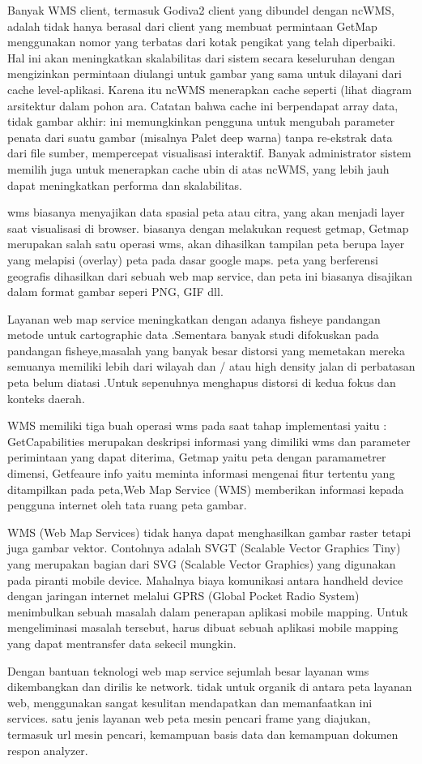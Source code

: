 Banyak WMS client, termasuk Godiva2 client yang dibundel dengan ncWMS, adalah tidak hanya berasal dari client yang membuat permintaan GetMap menggunakan nomor yang terbatas dari kotak pengikat yang telah diperbaiki. Hal ini akan meningkatkan skalabilitas dari sistem secara keseluruhan dengan mengizinkan permintaan diulangi untuk gambar yang sama untuk dilayani dari cache level-aplikasi. Karena itu ncWMS menerapkan cache seperti (lihat diagram arsitektur dalam pohon ara.  Catatan bahwa cache ini berpendapat array data, tidak gambar akhir: ini memungkinkan pengguna untuk mengubah parameter penata dari suatu gambar (misalnya Palet deep warna) tanpa re-ekstrak data dari file sumber, mempercepat visualisasi interaktif. Banyak administrator sistem memilih juga untuk menerapkan cache ubin di atas ncWMS, yang lebih jauh dapat meningkatkan performa dan skalabilitas.

wms biasanya menyajikan data spasial peta atau citra, yang akan menjadi layer saat visualisasi di browser. 
biasanya dengan melakukan request getmap, Getmap merupakan salah satu operasi wms, akan dihasilkan tampilan peta berupa layer yang melapisi (overlay) peta pada dasar google maps. peta yang berferensi geografis dihasilkan dari sebuah web map service, dan peta ini biasanya disajikan dalam format gambar seperi PNG, GIF dll.

Layanan web map service  meningkatkan dengan  adanya fisheye pandangan metode untuk cartographic data .Sementara banyak studi difokuskan pada pandangan fisheye,masalah yang banyak besar distorsi yang memetakan mereka semuanya memiliki lebih dari wilayah dan / atau high density jalan di perbatasan peta belum diatasi .Untuk sepenuhnya menghapus distorsi di kedua fokus dan konteks daerah.

WMS memiliki tiga buah operasi wms pada saat tahap implementasi yaitu : GetCapabilities merupakan deskripsi informasi yang dimiliki wms
dan parameter perimintaan yang dapat diterima, Getmap yaitu peta dengan paramametrer dimensi, Getfeaure info yaitu meminta informasi 
mengenai fitur tertentu yang ditampilkan pada peta,Web Map Service (WMS) memberikan informasi kepada pengguna internet oleh tata ruang peta gambar.

WMS (Web Map Services) tidak hanya dapat menghasilkan gambar raster tetapi juga gambar vektor. Contohnya  adalah SVGT (Scalable Vector Graphics Tiny) yang merupakan bagian dari SVG (Scalable Vector Graphics) yang digunakan pada piranti mobile device. Mahalnya biaya komunikasi antara handheld device dengan jaringan internet melalui GPRS (Global Pocket Radio System) menimbulkan sebuah masalah dalam penerapan aplikasi mobile mapping. Untuk mengeliminasi masalah tersebut, harus dibuat sebuah aplikasi mobile mapping yang dapat mentransfer data sekecil mungkin.

  Dengan bantuan teknologi web map service  sejumlah besar layanan wms dikembangkan dan dirilis ke network. tidak untuk organik di antara peta layanan web, menggunakan sangat kesulitan mendapatkan dan memanfaatkan ini services. satu jenis layanan web peta mesin pencari frame yang diajukan, termasuk url mesin pencari, kemampuan basis data dan kemampuan dokumen respon analyzer.
  
  
